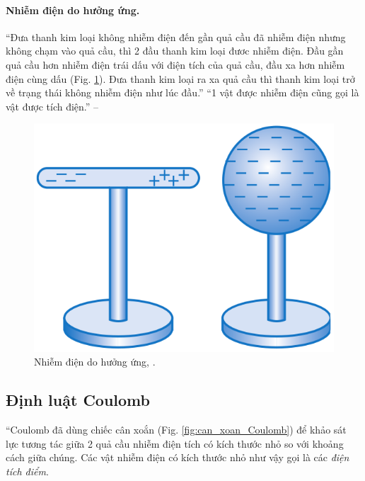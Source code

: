 \documentclass[oneside]{book}
\numberwithin{equation}{section}
\begin{document}
\paragraph{Nhiễm điện do hưởng ứng.} ``Đưa thanh kim loại không nhiễm điện đến gần quả cầu đã nhiễm điện nhưng không chạm vào quả cầu, thì 2 đầu thanh kim loại đươc nhiễm điện. Đầu gần quả cầu hơn nhiễm điện trái dấu với điện tích của quả cầu, đầu xa hơn nhiễm điện cùng dấu (Fig. \ref{fig:nhiem_dien_do_huong_ung}). Đưa thanh kim loại ra xa quả cầu thì thanh kim loại trở về trạng thái không nhiễm điện như lúc đầu.'' ``1 vật được nhiễm điện cũng gọi là vật được tích điện.'' -- \cite[p. 7]{SGK_Vat_Ly_11_nang_cao}

\begin{figure}[H]
	\centering
	\includegraphics[scale=0.15]{nhiem_dien_do_huong_ung}
	\caption{Nhiễm điện do hưởng ứng, \cite[Hình 1.4, p. 7]{SGK_Vat_Ly_11_nang_cao}.}
	\label{fig:nhiem_dien_do_huong_ung}
\end{figure}

\subsection{Định luật Coulomb}
``Coulomb đã dùng chiếc cân xoắn (Fig. \ref{fig:can_xoan_Coulomb}) để khảo sát lực tương tác giữa 2 quả cầu nhiễm điện tích có kích thước nhỏ so với khoảng cách giữa chúng. Các vật nhiễm điện có kích thước nhỏ như vậy gọi là các \textit{điện tích điểm}.
\end{document}
